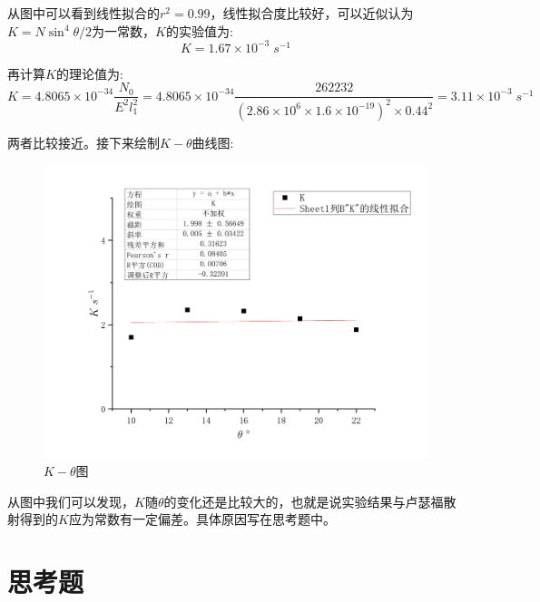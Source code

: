 \documentclass[utf8]{ctexart}
\begin{document}
从图中可以看到线性拟合的$r^2=0.99$，线性拟合度比较好，可以近似认为$K=N\sin^4{\theta/2}$为一常数，$K$的实验值为:
\begin{equation}
	K = 1.67 \times 10^{-3} \; s^{-1}
\end{equation}

再计算$K$的理论值为:
\begin{equation}
	K=4.8065 \times 10^{-34}\frac{N_0}{E^2l_1^2} = 4.8065 \times 10^{-34}\frac{262232}{(2.86 \times 10^6 \times 1.6\times{10^{-19}})^2 \times 0.44^2} = 3.11 \times 10^{-3} \; s^{-1}
\end{equation}

两者比较接近。接下来绘制$K-\theta$曲线图:
\begin{figure}[!htbp]
	\centering
	\includegraphics[scale=0.37]{Graph4.png}
	\caption{$K-\theta$图}
\end{figure}

从图中我们可以发现，$K$随$\theta$的变化还是比较大的，也就是说实验结果与卢瑟福散射得到的$K$应为常数有一定偏差。具体原因写在思考题中。


\section*{思考题}
\end{document}
